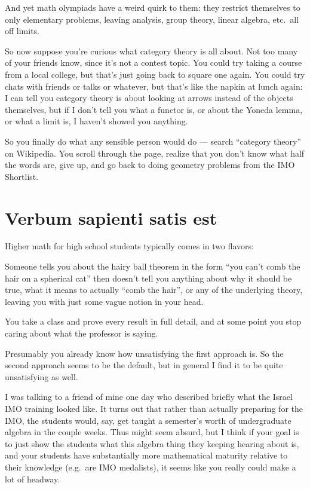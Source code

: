 And yet math olympiads have a weird quirk to them:
they restrict themselves to only elementary problems,
leaving analysis, group theory, linear algebra, etc.\ all off limits.

So now suppose you're curious what category theory is all about.
Not too many of your friends know, since it's not a contest topic.
You could try taking a course from a local college, but that's just going back to square one again.
You could try chats with friends or talks or whatever, but that's like the napkin at lunch again:
I can tell you category theory is about looking at arrows instead of the objects themselves,
but if I don't tell you what a functor is, or about the Yoneda lemma,
or what a limit is, I haven't showed you anything.

So you finally do what any sensible person would do --- search ``category theory'' on Wikipedia.
You scroll through the page, realize that you don't know what half the words are,
give up, and go back to doing geometry problems from the IMO Shortlist.

\section*{Verbum sapienti satis est}
Higher math for high school students typically comes in two flavors:
\begin{itemize}
	\ii Someone tells you about the hairy ball theorem in the form
	``you can't comb the hair on a spherical cat''
	then doesn't tell you anything about why it should be true,
	what it means to actually ``comb the hair'', 
	or any of the underlying theory,
	leaving you with just some vague notion in your head.

	\ii You take a class and prove every result in full detail,
	and at some point
	you stop caring about what the professor is saying.
\end{itemize}
Presumably you already know how unsatisfying the first approach is.
So the second approach seems to be the default,
but in general I find it to be quite unsatisfying as well.

I was talking to a friend of mine one day who described briefly
what the Israel IMO training looked like.
It turns out that rather than actually preparing for the IMO,
the students would, say, get taught a semester's worth of
undergraduate algebra in the couple weeks.
Thus might seem absurd, but I think if your goal is to just show the students
what this algebra thing they keeping hearing about is,
and your students have substantially more mathematical maturity
relative to their knowledge (e.g.\ are IMO medalists),
it seems like you really could make a lot of headway.

